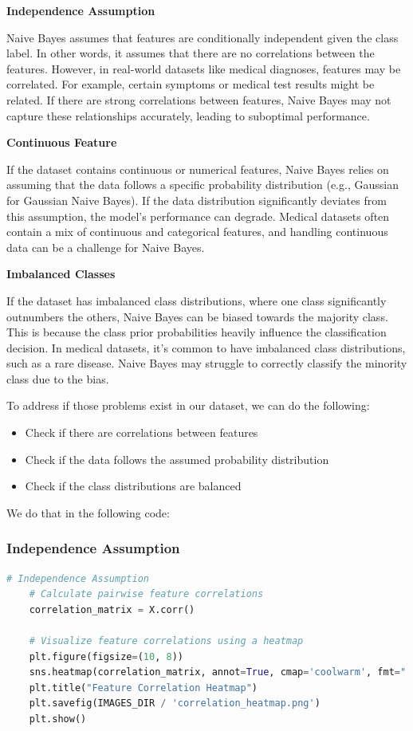 \documentclass{article}
\begin{document}
\textbf{Independence Assumption}

Naive Bayes assumes that features are conditionally independent given the class label. In other words, it assumes that there are no correlations between the features. However, in real-world datasets like medical diagnoses, features may be correlated. For example, certain symptoms or medical test results might be related. If there are strong correlations between features, Naive Bayes may not capture these relationships accurately, leading to suboptimal performance.


\textbf{Continuous Feature} 

If the dataset contains continuous or numerical features, Naive Bayes relies on assuming that the data follows a specific probability distribution (e.g., Gaussian for Gaussian Naive Bayes). If the data distribution significantly deviates from this assumption, the model's performance can degrade. Medical datasets often contain a mix of continuous and categorical features, and handling continuous data can be a challenge for Naive Bayes.


\textbf{Imbalanced Classes} 

If the dataset has imbalanced class distributions, where one class significantly outnumbers the others, Naive Bayes can be biased towards the majority class. This is because the class prior probabilities heavily influence the classification decision. In medical datasets, it's common to have imbalanced class distributions, such as a rare disease. Naive Bayes may struggle to correctly classify the minority class due to the bias.

To address if those problems exist in our dataset, we can do the following:
\begin{itemize}
  \item Check if there are correlations between features
  \item Check if the data follows the assumed probability distribution
  \item Check if the class distributions are balanced
\end{itemize}

We do that in the following code:

\subsubsection*{Independence Assumption}
  \begin{lstlisting}[language=Python]
    # Independence Assumption
    # Calculate pairwise feature correlations
    correlation_matrix = X.corr()

    # Visualize feature correlations using a heatmap
    plt.figure(figsize=(10, 8))
    sns.heatmap(correlation_matrix, annot=True, cmap='coolwarm', fmt=".2f")
    plt.title("Feature Correlation Heatmap")
    plt.savefig(IMAGES_DIR / 'correlation_heatmap.png')
    plt.show()
  \end{lstlisting}
\end{document}
